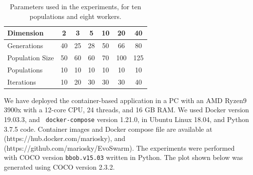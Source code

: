 \documentclass[runningheads]{llncs}
\begin{document}
\begin{table}[h!tb]
  \small
  \caption{Parameters used in the experiments, for ten populations and eight workers.
  }
  \label{tab:params:10}
  \vspace{0.25cm}
  \centering
  \small
  \begin{tabular}{|l|c|c|c|c|c|c|}
    \hline
    Dimension        & 2  & 3  & 5  & 10 & 20  & 40  \\ \hline
    Generations      & 40 & 25 & 28 & 50 & 66  & 80  \\ \hline
    Population Size  & 50 & 60 & 60 & 70 & 100 & 125 \\ \hline
    Populations      & 10 & 10 & 10 & 10 & 10  & 10  \\ \hline
    Iterations       & 10 & 20 & 30 & 30 & 30  & 40  \\ \hline
  \end{tabular}
\end{table}

We have deployed the container-based application in a PC with
an AMD Ryzen9 3900x with a 12-core CPU, 24 threads, and 16 GB RAM. We
used Docker version 19.03.3,  and {\tt
docker-compose} version 1.21.0, in Ubuntu Linux 18.04, and Python
3.7.5 code. Container images and Docker compose file are available at
(https://hub.docker.com/mariosky), and (https://github.com/mariosky/EvoSwarm).  The
experiments were performed with COCO \cite{hansen2016coco} version
{\tt bbob.v15.03} written in Python. The plot shown below was generated
using COCO version 2.3.2.
\end{document}
